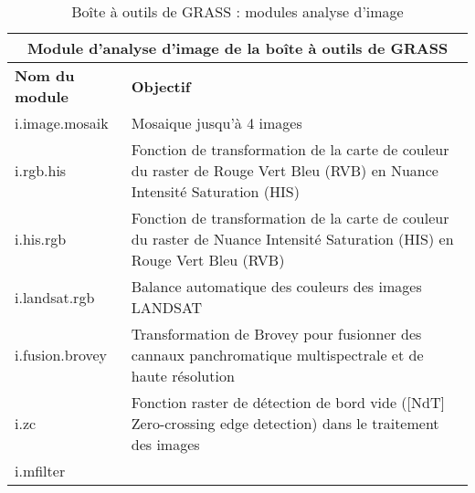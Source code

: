 \begin{table}[ht]
\centering
\caption{Bo\^ite \`a outils de GRASS : modules analyse d'image}\medskip
 \begin{tabular}{|p{4cm}|p{12cm}|}
  \hline \multicolumn{2}{|c|}{\textbf{Module d'analyse d'image de la bo\^ite \`a outils de GRASS}} \\
  \hline \textbf{Nom du module} & \textbf{Objectif} \\
  \hline i.image.mosaik & Mosaique jusqu'\`a 4 images\\
  \hline i.rgb.his & Fonction de transformation de la carte de couleur du raster de Rouge Vert Bleu (RVB) en Nuance Intensit\'e Saturation (HIS)\\
  \hline i.his.rgb & Fonction de transformation de la carte de couleur du raster de Nuance Intensit\'e Saturation (HIS) en Rouge Vert Bleu (RVB) \\
  \hline i.landsat.rgb & Balance automatique des couleurs des images LANDSAT \\
  \hline i.fusion.brovey & Transformation de Brovey pour fusionner des cannaux panchromatique multispectrale et de haute r\'esolution\\
  \hline i.zc & Fonction raster de d\'etection de bord vide ([NdT] Zero-crossing edge detection) dans le traitement des images \\
  \hline i.mfilter &  \\

\end{tabular}
\end{table}
